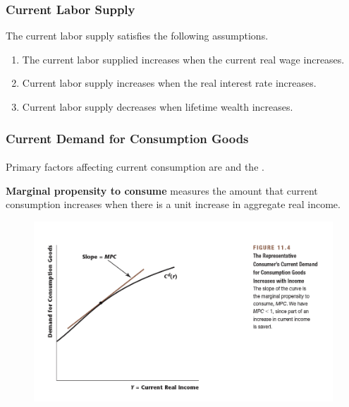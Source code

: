 \documentclass[11pt]{article}
\begin{document}
			\subsubsection{Current Labor Supply}
			\begin{assumption}
				The current labor supply satisfies the following assumptions.
				\begin{enumerate}
					\item The  current labor supplied increases when the current real wage increases.
					\item Current labor supply increases when the real interest rate increases.
					\item Current labor supply decreases when lifetime wealth increases.
				\end{enumerate}				
			\end{assumption}
			
			\subsubsection{Current Demand for Consumption Goods}
			\paragraph{} Primary factors affecting current consumption are  and the .
			
			\begin{definition}
				\textbf{Marginal propensity to consume} measures the amount that current consumption increases when there is a unit increase in aggregate real income.
			\end{definition}
				
			\begin{figure}[h]
				\centering
				\includegraphics[width=\linewidth]{figures/114}
			\end{figure}
			\newpage
			
\end{document}
